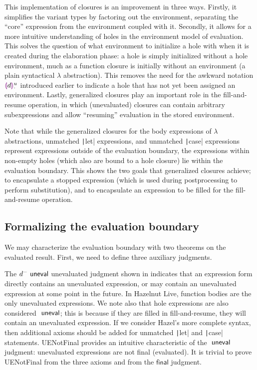 This implementation of closures is an improvement in three ways. Firstly, it simplifies the variant types by factoring out the environment, separating the ``core'' expression from the environment coupled with it. Secondly, it allows for a more intuitive understanding of holes in the environment model of evaluation. This solves the question of what environment to initialize a hole with when it is created during the elaboration phase: a hole is simply initialized without a hole environment, much as a function closure is initially without an environment (a plain syntactical $\lambda$ abstraction). This removes the need for the awkward notation $\textcolor{violet}{\llparenthesis} d\textcolor{violet}{\rrparenthesis}_\cdot^u$ introduced earlier to indicate a hole that has not yet been assigned an environment. Lastly, generalized closures play an important role in the fill-and-resume operation, in which (unevaluated) closures can contain arbitrary subexpressions and allow ``resuming'' evaluation in the stored environment.

Note that while the generalized closures for the body expressions of $\lambda$ abstractions, unmatched \texttt|let| expressions, and unmatched \texttt|case| expressions represent expressions outside of the evaluation boundary, the expressions within non-empty holes (which also are bound to a hole closure) lie within the evaluation boundary. This shows the two goals that generalized closures achieve; to encapsulate a stopped expression (which is used during postprocessing to perform substitution), and to encapsulate an expression to be filled for the fill-and-resume operation.

\subsection{Formalizing the evaluation boundary}
\label{sec:eval-boundary-metatheorem}

We may characterize the evaluation boundary with two theorems on the evaluated result. First, we need to define three auxiliary judgments.

The $d^-\textsf{ uneval}$ unevaluated judgment shown in  indicates that an expression form directly contains an unevaluated expression, or may contain an unevaluated expression at some point in the future. In Hazelnut Live, function bodies are the only unevaluated expressions. We note also that hole expressions are also considered $\textsf{ uneval}$; this is because if they are filled in fill-and-resume, they will contain an unevaluated expression. If we consider Hazel's more complete syntax, then additional axioms should be added for unmatched \texttt|let| and \texttt|case| statements. UENotFinal provides an intuitive characteristic of the $\textsf{ uneval}$ judgment: unevaluated expressions are not final (evaluated). It is trivial to prove UENotFinal from the three axioms and from the $\textsf{final}$ judgment.

